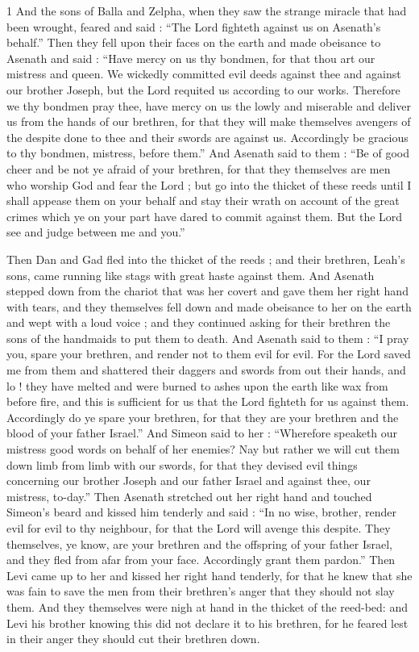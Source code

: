 1 And the sons of Balla and Zelpha, when they saw the strange miracle that had been wrought, feared and said : “The Lord fighteth against us on Asenath's behalf.” Then they fell upon their faces on the earth and made obeisance to Asenath and said : “Have mercy on us thy bondmen, for that thou art our mistress and queen. We wickedly committed evil deeds against thee and against our brother Joseph, but the Lord requited us according to our works. Therefore we thy bondmen pray thee, have mercy on us the lowly and miserable and deliver us from the hands of our brethren, for that they will make themselves avengers of the despite done to thee and their swords are against us. Accordingly be gracious to thy bondmen, mistress, before them.” And Asenath said to them : “Be of good cheer and be not ye afraid of your brethren, for that they themselves are men who worship God and fear the Lord ; but go into the thicket of these reeds until I shall appease them on your behalf and stay their wrath on account of the great crimes which ye on your part have dared to commit against them. But the Lord see and judge between me and you.”


Then Dan and Gad fled into the thicket of the reeds ; and their brethren, Leah's sons, came running like stags with great haste against them. And Asenath stepped down from the chariot that was her covert and gave them her right hand with tears, and they themselves fell down and made obeisance to her on the earth and wept with a loud voice ; and they continued asking for their brethren the sons of the handmaids to put them to death. And Asenath said to them : “I pray you, spare your brethren, and render not to them evil for evil. For the Lord saved me from them and shattered their daggers and swords from out their hands, and lo ! they have melted and were burned to ashes upon the earth like wax from before fire, and this is sufficient for us that the Lord fighteth for us against them. Accordingly do ye spare your brethren, for that they are your brethren and the blood of your father Israel.” And Simeon said to her : “Wherefore speaketh our mistress good words on behalf of her enemies? Nay but rather we will cut them down limb from limb with our swords, for that they devised evil things concerning our brother Joseph and our father Israel and against thee, our mistress, to-day.” Then Asenath stretched out her right hand and touched Simeon's beard and kissed him tenderly and said : “In no wise, brother, render evil for evil to thy neighbour, for that the Lord will avenge this despite. They themselves, ye know, are your brethren and the offspring of your father Israel, and they fled from afar from your face. Accordingly grant them pardon.” Then Levi came up to her and kissed her right hand tenderly, for that he knew that she was fain to save the men from their brethren's anger that they should not slay them. And they themselves were nigh at hand in the thicket of the reed-bed: and Levi his brother knowing this did not declare it to his brethren, for he feared lest in their anger they should cut their brethren down. 

